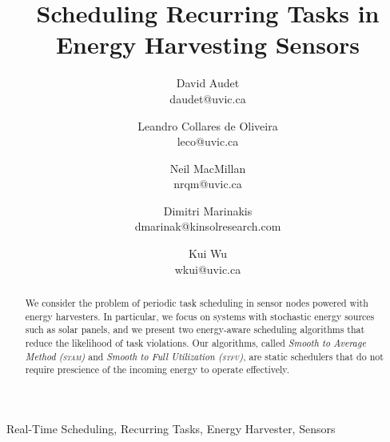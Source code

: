 \documentclass[10pt,conference]{IEEEtran}
\begin{document}
\title{Scheduling Recurring Tasks in Energy Harvesting Sensors}
\author{David Audet\\daudet@uvic.ca \and Leandro {Collares de Oliveira}\\leco@uvic.ca \and Neil MacMillan\\nrqm@uvic.ca \and Dimitri Marinakis\\dmarinak@kinsolresearch.com \and Kui Wu\\wkui@uvic.ca}

\maketitle


\begin{abstract}

We consider the problem of periodic task scheduling in sensor nodes powered with energy harvesters. In particular, we focus on systems with stochastic energy sources such as solar panels, and we present two energy-aware scheduling algorithms that reduce the likelihood of task violations. Our algorithms, called \emph{Smooth to Average Method (\textsc{stam})} and \emph{Smooth to Full Utilization (\textsc{stfu})}, are static schedulers that do not require prescience of the incoming energy to operate effectively.
\end{abstract}

\begin{IEEEkeywords} Real-Time Scheduling, Recurring Tasks, Energy Harvester, Sensors
\end{IEEEkeywords}















\balance




\end{document}
